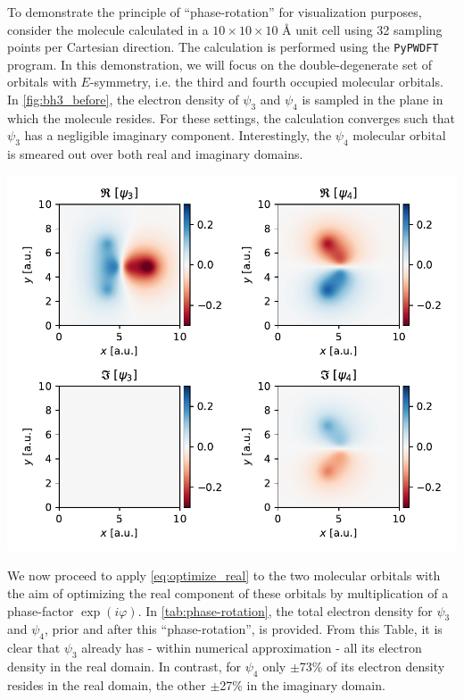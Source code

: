 To demonstrate the principle of ``phase-rotation'' for visualization purposes, consider the  molecule calculated in a $10 \times 10 \times 10$ \AA\; unit cell using 32 sampling points per Cartesian direction. The calculation is performed using the \texttt{PyPWDFT}\cite{pypwdft} program. In this demonstration, we will focus on the double-degenerate set of orbitals with $E$-symmetry, i.e. the third and fourth occupied molecular orbitals. In \cref{fig:bh3_before}, the electron density of $\psi_{3}$ and $\psi_{4}$ is sampled in the plane in which the  molecule resides. For these settings, the calculation converges such that $\psi_{3}$ has a negligible imaginary component. Interestingly, the $\psi_{4}$ molecular orbital is smeared out over both real and imaginary domains. 

\begin{Figure}
    \centering
    \includegraphics[width=\linewidth]{img/fig9.pdf}
    \label{fig:bh3_before}
\end{Figure}

We now proceed to apply \cref{eq:optimize_real} to the two molecular orbitals with the aim of optimizing the real component of these orbitals by multiplication of a phase-factor $\exp \left(i \varphi \right)$. In \cref{tab:phase-rotation}, the total electron density for $\psi_{3}$ and $\psi_{4}$, prior and after this ``phase-rotation'', is provided. From this Table, it is clear that $\psi_{3}$ already has - within numerical approximation - all its electron density in the real domain. In contrast, for $\psi_{4}$ only $\pm$73\% of its electron density resides in the real domain, the other $\pm$27\% in the imaginary domain.

